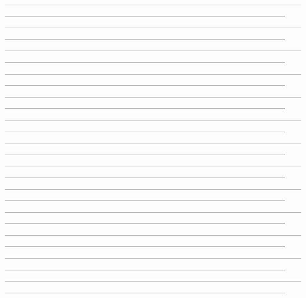 \documentclass{article}
\theoremstyle{definition}
\begin{document}
------------------------------------------------------------------------------------------------------------------------------------------------------------------------------------------------------------------
------------------------------------------------------------------------------------------------------------------------------------------------------------------------------------------------------------------
------------------------------------------------------------------------------------------------------------------------------------------------------------------------------------------------------------------
------------------------------------------------------------------------------------------------------------------------------------------------------------------------------------------------------------------
------------------------------------------------------------------------------------------------------------------------------------------------------------------------------------------------------------------
------------------------------------------------------------------------------------------------------------------------------------------------------------------------------------------------------------------
------------------------------------------------------------------------------------------------------------------------------------------------------------------------------------------------------------------
------------------------------------------------------------------------------------------------------------------------------------------------------------------------------------------------------------------
------------------------------------------------------------------------------------------------------------------------------------------------------------------------------------------------------------------
------------------------------------------------------------------------------------------------------------------------------------------------------------------------------------------------------------------
------------------------------------------------------------------------------------------------------------------------------------------------------------------------------------------------------------------
------------------------------------------------------------------------------------------------------------------------------------------------------------------------------------------------------------------
------------------------------------------------------------------------------------------------------------------------------------------------------------------------------------------------------------------
\end{document}
